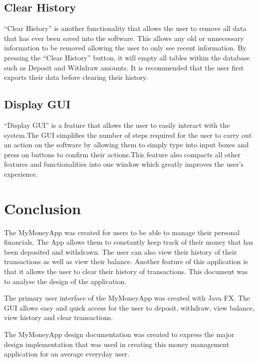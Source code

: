 \documentclass[12pt]{article}
\begin{document}
\subsection{Clear History}
“Clear History” is another functionality that allows the user to remove all data that has ever been saved into the software. This allows any old or unnecessary information to be removed allowing the user to only see recent information. By pressing the “Clear History” button, it will empty all tables within the database such as Deposit and Withdraw amounts. It is recommended that the user first exports their data before clearing their history. 

\subsection{Display GUI}
“Display GUI” is a feature that allows the user to easily interact with the system.The GUI simplifies the number of steps required for the user to carry out an action on the software by allowing them to simply type into input boxes and press on buttons to confirm their actions.This feature also compacts all other features and functionalities into one window which greatly improves the user’s experience. 

\section{Conclusion}
The MyMoneyApp was created for users to be able to manage their personal financials. The App allows them to constantly keep track of their money that has been deposited and withdrawn. The user can also view their history of their transactions as well as view their balance. Another feature of this application is that it allows the user to clear their history of transactions. This document was to analyse the design of the application.

The primary user interface of the MyMoneyApp was created with Java FX. The GUI allows easy and quick access for the user to deposit, withdraw, view balance, view history and clear transactions. 
 
The MyMoneyApp design documentation was created to express the major design implementation that was used in creating this money management application for an average everyday user.
\end{document}
